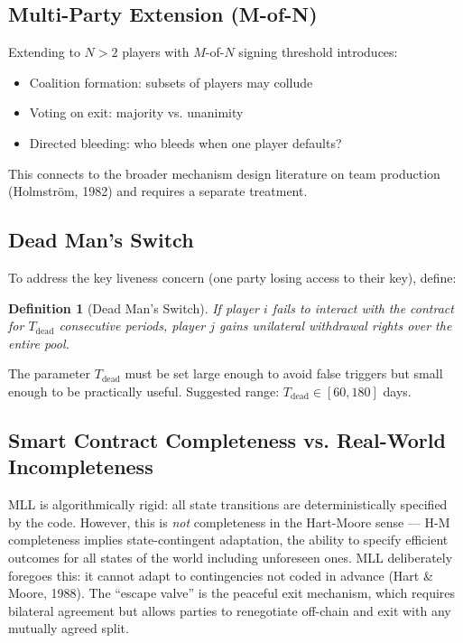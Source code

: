 \documentclass[12pt]{article}
\newtheorem{definition}{Definition}
\begin{document}
\subsection{Multi-Party Extension (M-of-N)}

Extending to $N > 2$ players with $M$-of-$N$ signing threshold introduces:
\begin{itemize}
    \item Coalition formation: subsets of players may collude
    \item Voting on exit: majority vs. unanimity
    \item Directed bleeding: who bleeds when one player defaults?
\end{itemize}

This connects to the broader mechanism design literature on team production (Holmstr\"om, 1982) and requires a separate treatment.

\subsection{Dead Man's Switch}

To address the key liveness concern (one party losing access to their key), define:
\begin{definition}[Dead Man's Switch]
If player $i$ fails to interact with the contract for $T_{\text{dead}}$ consecutive periods, player $j$ gains unilateral withdrawal rights over the entire pool.
\end{definition}

The parameter $T_{\text{dead}}$ must be set large enough to avoid false triggers but small enough to be practically useful. Suggested range: $T_{\text{dead}} \in [60, 180]$ days.

\subsection{Smart Contract Completeness vs. Real-World Incompleteness}

MLL is algorithmically rigid: all state transitions are deterministically specified by the code. However, this is \textit{not} completeness in the Hart-Moore sense --- H-M completeness implies state-contingent adaptation, the ability to specify efficient outcomes for all states of the world including unforeseen ones. MLL deliberately foregoes this: it cannot adapt to contingencies not coded in advance (Hart \& Moore, 1988). The ``escape valve'' is the peaceful exit mechanism, which requires bilateral agreement but allows parties to renegotiate off-chain and exit with any mutually agreed split.
\end{document}
